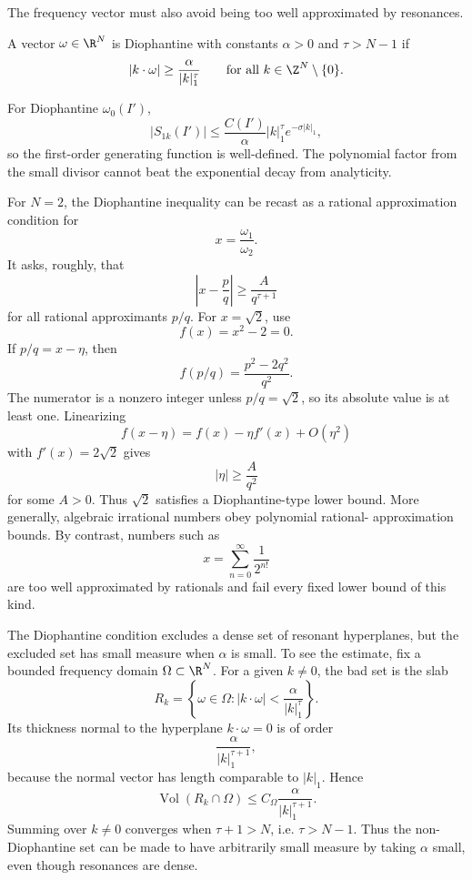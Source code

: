 The frequency vector must also avoid being too well approximated by resonances.

\begin{definition}
A vector \(\omega\in\R^N\) is Diophantine with constants \(\alpha>0\) and
\(\tau>N-1\) if
\[
  |k\cdot\omega|
  \geq
  \frac{\alpha}{|k|_1^\tau}
  \qquad
  \text{for all } k\in\Z^N\setminus\{0\}.
\]
\end{definition}

For Diophantine \(\omega_0(I')\),
\[
  |S_{1k}(I')|
  \leq
  \frac{C(I')}{\alpha}|k|_1^\tau e^{-\sigma |k|_1},
\]
so the first-order generating function is well-defined. The polynomial factor
from the small divisor cannot beat the exponential decay from analyticity.

\begin{example}
For \(N=2\), the Diophantine inequality can be recast as a rational
approximation condition for
\[
  x=\frac{\omega_1}{\omega_2}.
\]
It asks, roughly, that
\[
  \left|x-\frac{p}{q}\right|
  \geq
  \frac{A}{q^{\tau+1}}
\]
for all rational approximants \(p/q\). For \(x=\sqrt2\), use
\[
  f(x)=x^2-2=0.
\]
If \(p/q=x-\eta\), then
\[
  f(p/q)=\frac{p^2-2q^2}{q^2}.
\]
The numerator is a nonzero integer unless \(p/q=\sqrt2\), so its absolute value
is at least one. Linearizing
\[
  f(x-\eta)=f(x)-\eta f'(x)+O(\eta^2)
\]
with \(f'(x)=2\sqrt2\) gives
\[
  |\eta|\geq \frac{A}{q^2}
\]
for some \(A>0\). Thus \(\sqrt2\) satisfies a Diophantine-type lower bound.
More generally, algebraic irrational numbers obey polynomial rational-
approximation bounds. By contrast, numbers such as
\[
  x=\sum_{n=0}^{\infty}\frac{1}{2^{n!}}
\]
are too well approximated by rationals and fail every fixed lower bound of this
kind.
\end{example}

The Diophantine condition excludes a dense set of resonant hyperplanes, but the
excluded set has small measure when \(\alpha\) is small. To see the estimate,
fix a bounded frequency domain \(\Omega\subset\R^N\). For a given
\(k\neq0\), the bad set is the slab
\[
  R_k
  =
  \left\{
    \omega\in\Omega:
    |k\cdot\omega|<
    \frac{\alpha}{|k|_1^\tau}
  \right\}.
\]
Its thickness normal to the hyperplane \(k\cdot\omega=0\) is of order
\[
  \frac{\alpha}{|k|_1^{\tau+1}},
\]
because the normal vector has length comparable to \(|k|_1\). Hence
\[
  \operatorname{Vol}(R_k\cap\Omega)
  \leq
  C_\Omega\frac{\alpha}{|k|_1^{\tau+1}}.
\]
Summing over \(k\neq0\) converges when \(\tau+1>N\), i.e. \(\tau>N-1\). Thus
the non-Diophantine set can be made to have arbitrarily small measure by taking
\(\alpha\) small, even though resonances are dense.

